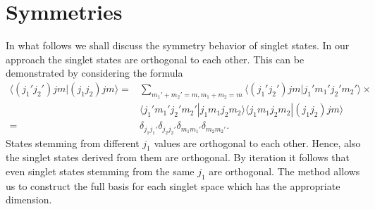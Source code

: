 \documentclass[pra,amsfonts,showpacs,preprint,showkeys]{revtex4}
\begin{document}





\section{Symmetries}
In what follows we shall discuss the symmetry behavior of singlet
states.
In our approach the singlet states are orthogonal to each other.
This can be demonstrated by considering the formula
\begin{align}
\langle(j_1'j_2')jm|(j_1j_2)jm\rangle =&\sum_{m_1'+m_2'=m,
m_1+m_2=m}\langle(j_1'j_2')jm|j_1'm_1'j_2'm_2'\rangle\times\nonumber\\
&\langle j_1'm_1'j_2'm_2'|j_1m_1j_2m_2\rangle\langle
j_1m_1j_2m_2|(j_1j_2)jm\rangle\\=&\delta_{j_1j_1'}\delta_{j_2j_2'}\delta_{m_1m_1'}\delta_{m_2m_2'}.\nonumber
\end{align}
States stemming from different
$j_1$ values are orthogonal to each other. Hence, also the singlet
states derived from them are orthogonal. By iteration it follows
that even singlet states stemming from the same $j_1$ are
orthogonal.
The method allows us to construct the full basis for each singlet space
which has the appropriate dimension.
\end{document}
